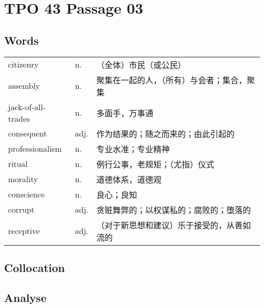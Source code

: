 \section{TPO 43 Passage 03}

\subsection{Words}

\begin{tabular}{lll}
    citizenry          & n.   & （全体）市民（或公民）           \\
    assembly           & n.   & 聚集在一起的人，（所有）与会者；集合，聚集 \\
    jack-of-all-trades & n.   & 多面手，万事通               \\
    consequent         & adj. & 作为结果的；随之而来的；由此引起的     \\
    professionalism    & n.   & 专业水准；专业精神             \\
    ritual             & n.   & 例行公事，老规矩；（尤指）仪式       \\
    morality           & n.   & 道德体系，道德观              \\
    conscience         & n.   & 良心；良知                 \\
    corrupt            & adj. & 贪赃舞弊的；以权谋私的；腐败的；堕落的   \\
    receptive          & adj. & （对于新思想和建议）乐于接受的，从善如流的 \\
\end{tabular}

\subsection{Collocation}

\newpage

\subsection{Analyse}

